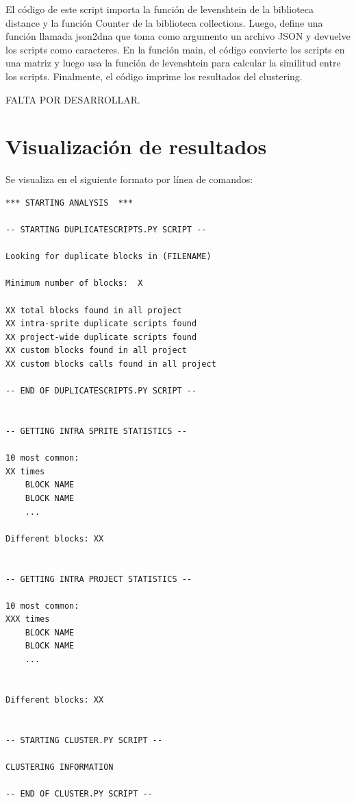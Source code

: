 \documentclass[a4paper, 12pt]{book}
\begin{document}
El código de este script importa la función de levenshtein de la biblioteca distance y la función Counter de la biblioteca collections. Luego, define una función llamada json2dna que toma como argumento un archivo JSON y devuelve los scripts como caracteres. En la función main, el código convierte los scripts en una matriz y luego usa la función de levenshtein para calcular la similitud entre los scripts. Finalmente, el código imprime los resultados del clustering.

FALTA POR DESARROLLAR.

\section{Visualización de resultados} 
\label{sec:visualizacionresultados}

Se visualiza en el siguiente formato por línea de comandos:

\begin{lstlisting}[style=consola,numbers=none]
*** STARTING ANALYSIS  ***

-- STARTING DUPLICATESCRIPTS.PY SCRIPT --

Looking for duplicate blocks in (FILENAME)

Minimum number of blocks:  X

XX total blocks found in all project
XX intra-sprite duplicate scripts found
XX project-wide duplicate scripts found
XX custom blocks found in all project
XX custom blocks calls found in all project

-- END OF DUPLICATESCRIPTS.PY SCRIPT --


-- GETTING INTRA SPRITE STATISTICS --

10 most common:
XX times
	BLOCK NAME
	BLOCK NAME
	...

Different blocks: XX


-- GETTING INTRA PROJECT STATISTICS --

10 most common:
XXX times
	BLOCK NAME
	BLOCK NAME
	...


Different blocks: XX


-- STARTING CLUSTER.PY SCRIPT --

CLUSTERING INFORMATION

-- END OF CLUSTER.PY SCRIPT --

\end{lstlisting}

\end{document}
